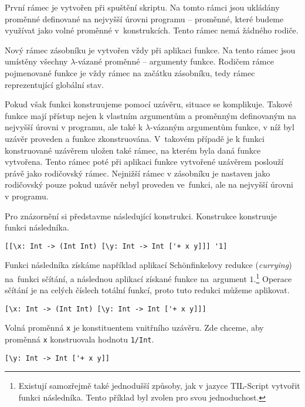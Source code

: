 První rámec je vytvořen při spuštění skriptu. Na tomto rámci jsou ukládány proměnné definované
na nejvyšší úrovni programu -- proměnné, které budeme využívat jako volné proměnné v~konstrukcích.
Tento rámec nemá žádného rodiče.

Nový rámec zásobníku je vytvořen vždy při aplikaci funkce. Na tento rámec jsou umístěny
všechny $\lambda$-vázané proměnné -- argumenty funkce. Rodičem rámce pojmenované funkce je vždy rámec
na začátku zásobníku, tedy rámec reprezentující globální stav.

Pokud však funkci konstruujeme pomocí uzávěru, situace se komplikuje. Takové funkce mají přístup
nejen k vlastním argumentům a proměnným definovaným na nejvyšší úrovni v programu, ale také
k $\lambda$-vázaným argumentům funkce, v níž byl uzávěr proveden a funkce zkonstruována. V~takovém
případě je k funkci konstruované uzávěrem uložen také rámec, na kterém byla daná funkce vytvořena.
Tento rámec poté při aplikaci funkce vytvořené uzávěrem poslouží právě jako rodičovský rámec.
Nejnižší rámec v zásobníku je nastaven jako rodičovský pouze pokud uzávěr nebyl proveden ve~funkci,
ale na nejvyšší úrovni v programu.

Pro znázornění si představme následující konstrukci. Konstrukce konstruuje funkci následníka.

\begin{lstlisting}[caption={Funkce následníka pomocí vnořených uzávěrů}]
[[\x: Int -> (Int Int) [\y: Int -> Int ['+ x y]]] '1]
\end{lstlisting}

Funkci následníka získáme například aplikací Sch{\"o}nfinkelovy redukce (\textit{currying})
na~funkci sčítání, a následnou aplikací získané funkce
na~argument $1$.\footnote{Existují samozřejmě také jednodušší způsoby, jak v jazyce TIL-Script
  vytvořit funkci následníka. Tento příklad byl zvolen pro svou jednoduchost.}
Operace sčítání je na celých číslech totální funkcí, proto tuto redukci můžeme aplikovat.

\begin{lstlisting}[caption={Vnější uzávěr}]
[\x: Int -> (Int Int) [\y: Int -> Int ['+ x y]]]
\end{lstlisting}

Volná proměnná \lstinline{x} je konstituentem vnitřního uzávěru. Zde chceme, aby proměnná
\lstinline{x} konstruovala hodnotu \lstinline{1/Int}.

\begin{lstlisting}[caption={Vnitřní uzávěr}]
[\y: Int -> Int ['+ x y]]
\end{lstlisting}

